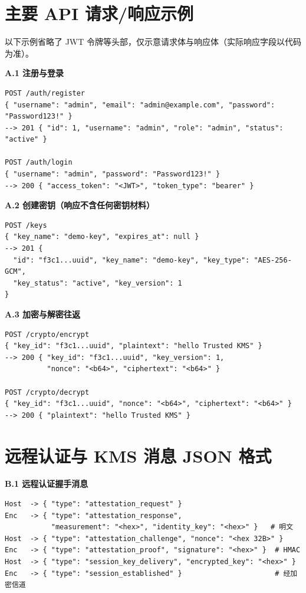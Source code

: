 
\chapter{主要 API 请求/响应示例}
\label{app:api}

以下示例省略了 JWT 令牌等头部，仅示意请求体与响应体（实际响应字段以代码为准）。

\textbf{A.1 注册与登录}
\begin{lstlisting}[language={}]
POST /auth/register
{ "username": "admin", "email": "admin@example.com", "password": "Password123!" }
--> 201 { "id": 1, "username": "admin", "role": "admin", "status": "active" }

POST /auth/login
{ "username": "admin", "password": "Password123!" }
--> 200 { "access_token": "<JWT>", "token_type": "bearer" }
\end{lstlisting}

\textbf{A.2 创建密钥（响应不含任何密钥材料）}
\begin{lstlisting}[language={}]
POST /keys
{ "key_name": "demo-key", "expires_at": null }
--> 201 {
  "id": "f3c1...uuid", "key_name": "demo-key", "key_type": "AES-256-GCM",
  "key_status": "active", "key_version": 1
}
\end{lstlisting}

\textbf{A.3 加密与解密往返}
\begin{lstlisting}[language={}]
POST /crypto/encrypt
{ "key_id": "f3c1...uuid", "plaintext": "hello Trusted KMS" }
--> 200 { "key_id": "f3c1...uuid", "key_version": 1,
          "nonce": "<b64>", "ciphertext": "<b64>" }

POST /crypto/decrypt
{ "key_id": "f3c1...uuid", "nonce": "<b64>", "ciphertext": "<b64>" }
--> 200 { "plaintext": "hello Trusted KMS" }
\end{lstlisting}

\chapter{远程认证与 KMS 消息 JSON 格式}
\label{app:proto}

\textbf{B.1 远程认证握手消息}
\begin{lstlisting}[language={}]
Host  -> { "type": "attestation_request" }
Enc   -> { "type": "attestation_response",
           "measurement": "<hex>", "identity_key": "<hex>" }   # 明文
Host  -> { "type": "attestation_challenge", "nonce": "<hex 32B>" }
Enc   -> { "type": "attestation_proof", "signature": "<hex>" }  # HMAC
Host  -> { "type": "session_key_delivery", "encrypted_key": "<hex>" }
Enc   -> { "type": "session_established" }                      # 经加密信道
\end{lstlisting}

